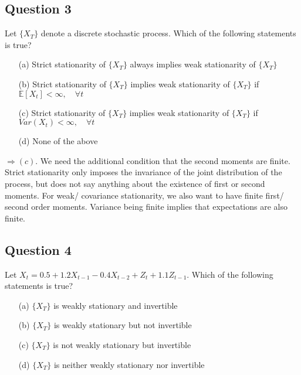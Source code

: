 \subsection*{Question 3}

Let $\{X_T\}$ denote a discrete stochastic process. Which of the following statements is true?

\begin{itemize}
    \item[(a)] Strict stationarity of $\{X_T\}$ always implies weak stationarity of $\{X_T\}$
    \item[(b)] Strict stationarity of $\{X_T\}$ implies weak stationarity of $\{X_T\}$ if $\mathbb{E}[X_t] < \infty, \quad \forall t$
    \item[(c)] Strict stationarity of $\{X_T\}$ implies weak stationarity of $\{X_T\}$ if $Var(X_t) < \infty, \quad \forall t$
    \item[(d)] None of the above
\end{itemize}

\begin{footnotesize}
$\Rightarrow (c)$. We need the additional condition that the second moments are finite. Strict stationarity only imposes the invariance of the joint distribution of the process, but does not say anything about the existence of first or second moments. For weak/ covariance stationarity, we also want to have finite first/ second order moments. Variance being finite implies that expectations are also finite. 
\end{footnotesize}



\subsection*{Question 4}

Let $X_t= 0.5 + 1.2X_{t-1} - 0.4 X_{t-2} + Z_t + 1.1 Z_{t-1} $. Which of the following statements is true? 

\begin{itemize}
    \item[(a)] $\{X_T\}$ is weakly stationary and invertible
    \item[(b)] $\{X_T\}$ is weakly stationary but not invertible 
    \item[(c)] $\{X_T\}$ is not weakly stationary but invertible
    \item[(d)] $\{X_T\}$ is neither weakly stationary nor invertible
\end{itemize}

